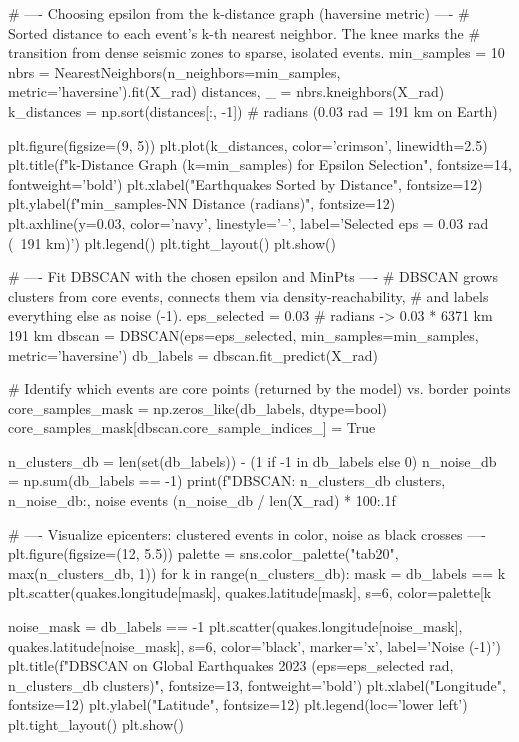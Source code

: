 \begin{codebox}[title={Choosing epsilon from the k-distance graph (haversine metric)}]
# ---- Choosing epsilon from the k-distance graph (haversine metric) ----
# Sorted distance to each event's k-th nearest neighbor. The knee marks the
# transition from dense seismic zones to sparse, isolated events.
min_samples = 10
nbrs = NearestNeighbors(n_neighbors=min_samples, metric='haversine').fit(X_rad)
distances, _ = nbrs.kneighbors(X_rad)
k_distances = np.sort(distances[:, -1])   # radians (0.03 rad = 191 km on Earth)

plt.figure(figsize=(9, 5))
plt.plot(k_distances, color='crimson', linewidth=2.5)
plt.title(f"k-Distance Graph (k={min_samples}) for Epsilon Selection", fontsize=14, fontweight='bold')
plt.xlabel("Earthquakes Sorted by Distance", fontsize=12)
plt.ylabel(f"{min_samples}-NN Distance (radians)", fontsize=12)
plt.axhline(y=0.03, color='navy', linestyle='--', label='Selected eps = 0.03 rad (~191 km)')
plt.legend()
plt.tight_layout()
plt.show()
\end{codebox}

\begin{codebox}[title={Fit DBSCAN with the chosen epsilon and MinPts}]
# ---- Fit DBSCAN with the chosen epsilon and MinPts ----
# DBSCAN grows clusters from core events, connects them via density-reachability,
# and labels everything else as noise (-1).
eps_selected = 0.03   # radians -> 0.03 * 6371 km ~ 191 km
dbscan = DBSCAN(eps=eps_selected, min_samples=min_samples, metric='haversine')
db_labels = dbscan.fit_predict(X_rad)

# Identify which events are core points (returned by the model) vs. border points
core_samples_mask = np.zeros_like(db_labels, dtype=bool)
core_samples_mask[dbscan.core_sample_indices_] = True

n_clusters_db = len(set(db_labels)) - (1 if -1 in db_labels else 0)
n_noise_db = np.sum(db_labels == -1)
print(f"DBSCAN: {n_clusters_db} clusters, {n_noise_db:,} noise events ({n_noise_db / len(X_rad) * 100:.1f}%

# ---- Visualize epicenters: clustered events in color, noise as black crosses ----
plt.figure(figsize=(12, 5.5))
palette = sns.color_palette("tab20", max(n_clusters_db, 1))
for k in range(n_clusters_db):
    mask = db_labels == k
    plt.scatter(quakes.longitude[mask], quakes.latitude[mask], s=6, color=palette[k %

noise_mask = db_labels == -1
plt.scatter(quakes.longitude[noise_mask], quakes.latitude[noise_mask], s=6, color='black', marker='x', label='Noise (-1)')
plt.title(f"DBSCAN on Global Earthquakes 2023 (eps={eps_selected} rad, {n_clusters_db} clusters)", fontsize=13, fontweight='bold')
plt.xlabel("Longitude", fontsize=12)
plt.ylabel("Latitude", fontsize=12)
plt.legend(loc='lower left')
plt.tight_layout()
plt.show()
\end{codebox}

